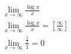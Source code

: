 \begin{ex}
\begin{align}
&\lim_{x\rightarrow \infty} \frac{\log{x}}{x}\nonumber\\
&\lim_{x\rightarrow \infty} \frac{\log{x}}{x}=\left[\frac{\infty}{\infty}\right]\nonumber\\
&\lim_{x\rightarrow \infty} \frac{\frac{1}{x}}{1}=0\nonumber
\end{align}
\end{ex}